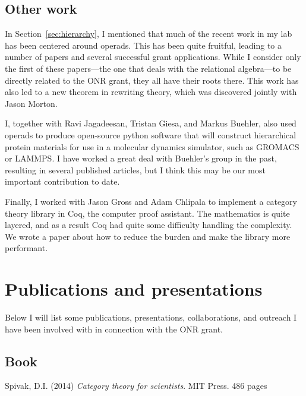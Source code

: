 \documentclass[11pt,oneside,article]{memoir}
\begin{document}
\section{Other work}

In Section~\ref{sec:hierarchy}, I mentioned that much of the recent work in my lab has been centered around operads. This has been quite fruitful, leading to a number of papers and several successful grant applications. While I consider only the first of these papers---the one that deals with the relational algebra---to be directly related to the ONR grant, they all have their roots there. This work has also led to a new theorem in rewriting theory, which was discovered jointly with Jason Morton.

I, together with Ravi Jagadeesan, Tristan Giesa, and Markus Buehler, also used operads to produce open-source python software that will construct hierarchical protein materials for use in a molecular dynamics simulator, such as GROMACS or LAMMPS. I have worked a great deal with Buehler's group in the past, resulting in several published articles, but I think this may be our most important contribution to date.

Finally, I worked with Jason Gross and Adam Chlipala to implement a category theory library in Coq, the computer proof assistant. The mathematics is quite layered, and as a result Coq had quite some difficulty handling the complexity. We wrote a paper about how to reduce the burden and make the library more performant.

\chapter{Publications and presentations}

Below I will list some publications, presentations, collaborations, and outreach I have been involved with in connection with the ONR grant.

\section{Book}

Spivak, D.I. (2014) {\em Category theory for scientists}. MIT Press. 486 pages
\end{document}
